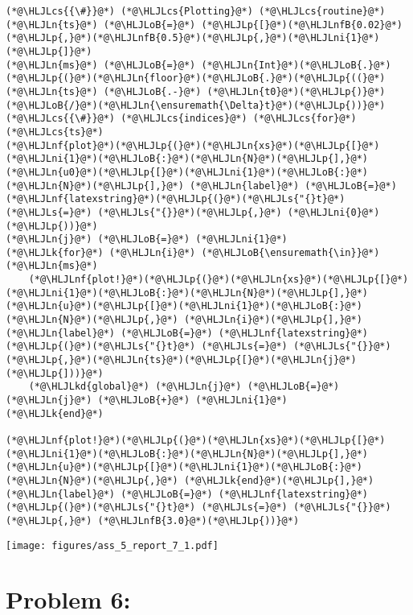 \documentclass[12pt,a4paper]{article}
\newcommand{\HLJLk}[1]{\textcolor[RGB]{148,91,176}{\textbf{#1}}}
\newcommand{\HLJLkd}[1]{\textcolor[RGB]{214,102,97}{\textit{#1}}}
\newcommand{\HLJLn}[1]{#1}
\newcommand{\HLJLnf}[1]{\textcolor[RGB]{66,102,213}{#1}}
\newcommand{\HLJLs}[1]{\textcolor[RGB]{201,61,57}{#1}}
\newcommand{\HLJLnfB}[1]{\textcolor[RGB]{59,151,46}{#1}}
\newcommand{\HLJLni}[1]{\textcolor[RGB]{59,151,46}{#1}}
\newcommand{\HLJLoB}[1]{\textcolor[RGB]{102,102,102}{\textbf{#1}}}
\newcommand{\HLJLp}[1]{#1}
\newcommand{\HLJLcs}[1]{\textcolor[RGB]{153,153,119}{\textit{#1}}}
\begin{document}
\begin{lstlisting}
(*@\HLJLcs{{\#}}@*) (*@\HLJLcs{Plotting}@*) (*@\HLJLcs{routine}@*)
(*@\HLJLn{ts}@*) (*@\HLJLoB{=}@*) (*@\HLJLp{[}@*)(*@\HLJLnfB{0.02}@*)(*@\HLJLp{,}@*)(*@\HLJLnfB{0.5}@*)(*@\HLJLp{,}@*)(*@\HLJLni{1}@*)(*@\HLJLp{]}@*)
(*@\HLJLn{ms}@*) (*@\HLJLoB{=}@*) (*@\HLJLn{Int}@*)(*@\HLJLoB{.}@*)(*@\HLJLp{(}@*)(*@\HLJLn{floor}@*)(*@\HLJLoB{.}@*)(*@\HLJLp{((}@*)(*@\HLJLn{ts}@*) (*@\HLJLoB{.-}@*) (*@\HLJLn{t0}@*)(*@\HLJLp{)}@*)(*@\HLJLoB{/}@*)(*@\HLJLn{\ensuremath{\Delta}t}@*)(*@\HLJLp{))}@*)(*@\HLJLcs{{\#}}@*) (*@\HLJLcs{indices}@*) (*@\HLJLcs{for}@*) (*@\HLJLcs{ts}@*)
(*@\HLJLnf{plot}@*)(*@\HLJLp{(}@*)(*@\HLJLn{xs}@*)(*@\HLJLp{[}@*)(*@\HLJLni{1}@*)(*@\HLJLoB{:}@*)(*@\HLJLn{N}@*)(*@\HLJLp{],}@*) (*@\HLJLn{u0}@*)(*@\HLJLp{[}@*)(*@\HLJLni{1}@*)(*@\HLJLoB{:}@*)(*@\HLJLn{N}@*)(*@\HLJLp{],}@*) (*@\HLJLn{label}@*) (*@\HLJLoB{=}@*) (*@\HLJLnf{latexstring}@*)(*@\HLJLp{(}@*)(*@\HLJLs{"{}t}@*) (*@\HLJLs{=}@*) (*@\HLJLs{"{}}@*)(*@\HLJLp{,}@*) (*@\HLJLni{0}@*) (*@\HLJLp{))}@*)
(*@\HLJLn{j}@*) (*@\HLJLoB{=}@*) (*@\HLJLni{1}@*)
(*@\HLJLk{for}@*) (*@\HLJLn{i}@*) (*@\HLJLoB{\ensuremath{\in}}@*) (*@\HLJLn{ms}@*)
    (*@\HLJLnf{plot!}@*)(*@\HLJLp{(}@*)(*@\HLJLn{xs}@*)(*@\HLJLp{[}@*)(*@\HLJLni{1}@*)(*@\HLJLoB{:}@*)(*@\HLJLn{N}@*)(*@\HLJLp{],}@*) (*@\HLJLn{u}@*)(*@\HLJLp{[}@*)(*@\HLJLni{1}@*)(*@\HLJLoB{:}@*)(*@\HLJLn{N}@*)(*@\HLJLp{,}@*) (*@\HLJLn{i}@*)(*@\HLJLp{],}@*) (*@\HLJLn{label}@*) (*@\HLJLoB{=}@*) (*@\HLJLnf{latexstring}@*)(*@\HLJLp{(}@*)(*@\HLJLs{"{}t}@*) (*@\HLJLs{=}@*) (*@\HLJLs{"{}}@*)(*@\HLJLp{,}@*)(*@\HLJLn{ts}@*)(*@\HLJLp{[}@*)(*@\HLJLn{j}@*)(*@\HLJLp{]))}@*)
    (*@\HLJLkd{global}@*) (*@\HLJLn{j}@*) (*@\HLJLoB{=}@*) (*@\HLJLn{j}@*) (*@\HLJLoB{+}@*) (*@\HLJLni{1}@*)
(*@\HLJLk{end}@*)

(*@\HLJLnf{plot!}@*)(*@\HLJLp{(}@*)(*@\HLJLn{xs}@*)(*@\HLJLp{[}@*)(*@\HLJLni{1}@*)(*@\HLJLoB{:}@*)(*@\HLJLn{N}@*)(*@\HLJLp{],}@*) (*@\HLJLn{u}@*)(*@\HLJLp{[}@*)(*@\HLJLni{1}@*)(*@\HLJLoB{:}@*)(*@\HLJLn{N}@*)(*@\HLJLp{,}@*) (*@\HLJLk{end}@*)(*@\HLJLp{],}@*) (*@\HLJLn{label}@*) (*@\HLJLoB{=}@*) (*@\HLJLnf{latexstring}@*)(*@\HLJLp{(}@*)(*@\HLJLs{"{}t}@*) (*@\HLJLs{=}@*) (*@\HLJLs{"{}}@*)(*@\HLJLp{,}@*) (*@\HLJLnfB{3.0}@*)(*@\HLJLp{))}@*)
\end{lstlisting}

\texttt{[image: figures/ass\_5\_report\_7\_1.pdf]}

\section{Problem 6:}
\end{document}
